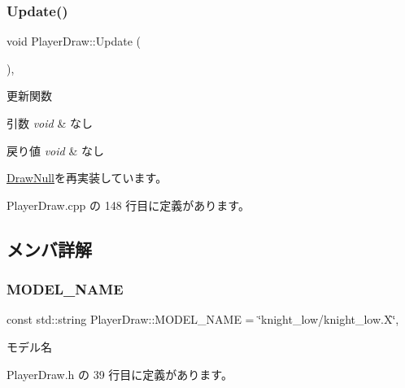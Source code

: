 \subsubsection{\texorpdfstring{Update()}{Update()}}
{\footnotesize\ttfamily void Player\+Draw\+::\+Update (\begin{DoxyParamCaption}{ }\end{DoxyParamCaption})\hspace{0.3cm}{\ttfamily [override]}, {\ttfamily [virtual]}}



更新関数 


\begin{DoxyParams}{引数}
{\em void} & なし \\
\hline
\end{DoxyParams}

\begin{DoxyRetVals}{戻り値}
{\em void} & なし \\
\hline
\end{DoxyRetVals}


\mbox{\hyperlink{class_draw_null_ad32a508d269de7eda8ad24ea72230464}{Draw\+Null}}を再実装しています。



 Player\+Draw.\+cpp の 148 行目に定義があります。



\subsection{メンバ詳解}
\mbox{\label{class_player_draw_a924cd73d9d8b1b2e662be2c79238354f}} 
\subsubsection{\texorpdfstring{M\+O\+D\+E\+L\+\_\+\+N\+A\+ME}{MODEL\_NAME}}
{\footnotesize\ttfamily const std\+::string Player\+Draw\+::\+M\+O\+D\+E\+L\+\_\+\+N\+A\+ME = \char`\"{}knight\+\_\+low/knight\+\_\+low.\+X\char`\"{}\hspace{0.3cm}{\ttfamily [static]}, {\ttfamily [private]}}



モデル名 



 Player\+Draw.\+h の 39 行目に定義があります。

